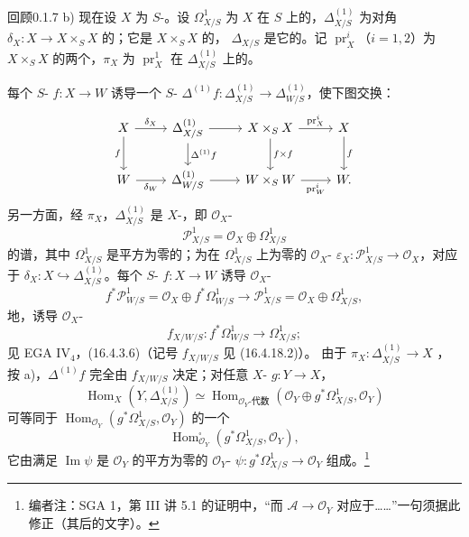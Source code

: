 \begin{SGAresult}{回顾}{0.1.7}
b) 现在设 $X$ 为 $S$-。设 $\Omega^1_{X/S}$ 为 $X$ 在 $S$ 上的，$\Delta^{(1)}_{X/S}$ 为对角 $\delta_X:X\to X\times_S X$ 的；它是 $X\times_S X$ 的， $\Delta_{X/S}$ 是它的。记 $\operatorname{pr}_X^i$（$i=1,2$）为 $X\times_S X$ 的两个，$\pi_X$ 为 $\operatorname{pr}_X^1$ 在 $\Delta^{(1)}_{X/S}$ 上的。

每个 $S$- $f:X\to W$ 诱导一个 $S$- $\Delta^{(1)}f:\Delta^{(1)}_{X/S}\to\Delta^{(1)}_{W/S}$，使下图交换：
\[\begin{tikzcd}
X\arrow[r,"\delta_X"]\arrow[d,"f"']&\Delta^{(1)}_{X/S}\arrow[r]\arrow[d,"\Delta^{(1)}f"]&X\times_S X\arrow[r,"\operatorname{pr}_X^i"]\arrow[d,"f\times f"]&X\arrow[d,"f"]\\
W\arrow[r,"\delta_W"']&\Delta^{(1)}_{W/S}\arrow[r]&W\times_S W\arrow[r,"\operatorname{pr}_W^i"']&W.
\end{tikzcd}\]
另一方面，经 $\pi_X$，$\Delta^{(1)}_{X/S}$ 是 $X$-，即 $\mathcal O_X$-
\[\mathcal P^1_{X/S}=\mathcal O_X\oplus\Omega^1_{X/S}\]
的谱，其中 $\Omega^1_{X/S}$ 是平方为零的；为在 $\Omega^1_{X/S}$ 上为零的 $\mathcal O_X$- $\varepsilon_X:\mathcal P^1_{X/S}\to\mathcal O_X$，对应于 $\delta_X:X\hookrightarrow\Delta^{(1)}_{X/S}$。每个 $S$- $f:X\to W$ 诱导 $\mathcal O_X$-
\[f^*\mathcal P^1_{W/S}=\mathcal O_X\oplus f^*\Omega^1_{W/S}\longrightarrow\mathcal P^1_{X/S}=\mathcal O_X\oplus\Omega^1_{X/S},\]
地，诱导 $\mathcal O_X$-
\[f_{X/W/S}:f^*\Omega^1_{W/S}\longrightarrow\Omega^1_{X/S};\]
见 EGA IV$_4$，(16.4.3.6)（记号 $f_{X/W/S}$ 见 (16.4.18.2)）。
由于 $\pi_X:\Delta^{(1)}_{X/S}\to X$ ，按 a)，$\Delta^{(1)}f$ 完全由 $f_{X/W/S}$ 决定；对任意 $X$- $g:Y\to X$，
\[\operatorname{Hom}_X(Y,\Delta^{(1)}_{X/S})\simeq\operatorname{Hom}_{\mathcal O_Y\text{-代数}}(\mathcal O_Y\oplus g^*\Omega^1_{X/S},\mathcal O_Y)\]
可等同于 $\operatorname{Hom}_{\mathcal O_Y}(g^*\Omega^1_{X/S},\mathcal O_Y)$ 的一个
\[\operatorname{Hom}^{\square}_{\mathcal O_Y}(g^*\Omega^1_{X/S},\mathcal O_Y),\]
它由满足 $\operatorname{Im}\psi$ 是 $\mathcal O_Y$ 的平方为零的 $\mathcal O_Y$- $\psi:g^*\Omega^1_{X/S}\to\mathcal O_Y$ 组成。\footnote{编者注：SGA 1，第 III 讲 5.1 的证明中，“而 $\mathcal A\to\mathcal O_Y$ 对应于……”一句须据此修正（其后的文字）。}


\end{SGAresult}
